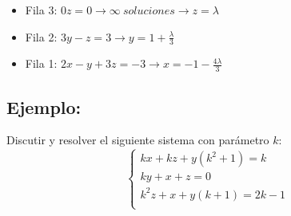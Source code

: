 \begin{itemize}
    \item Fila 3: $0z=0 \to \infty  \ soluciones \to z = \lambda$
    \item Fila 2: $3y-z=3 \to y= 1+\frac{\lambda}{3}$
    \item Fila 1: $2x-y+3z=-3 \to x= -1 - \frac{4\lambda}{3} $
\end{itemize}

\subsection{Ejemplo:}
Discutir y resolver el siguiente sistema con parámetro $k$: \\ $$\left\{ \begin{matrix}k x + k z + y \left(k^{2} + 1\right) = k \\ k y + x + z = 0 \\ k^{2} z + x + y \left(k + 1\right) = 2 k - 1 \\ \end{matrix}\right.$$ 

